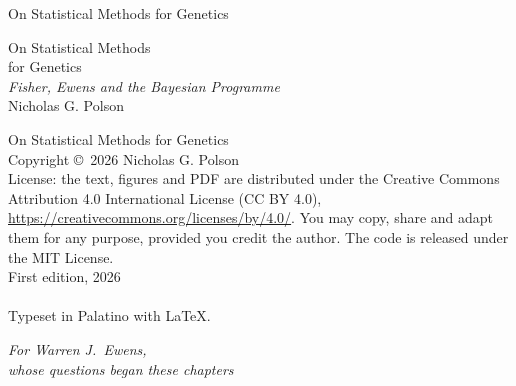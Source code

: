 \documentclass[11pt,openright,twoside]{book}
\theoremstyle{bookplain}
\theoremstyle{bookdef}
\numberwithin{equation}{chapter}
\numberwithin{figure}{chapter}
\numberwithin{table}{chapter}
\begin{document}
\frontmatter
\pagestyle{empty}

\begin{center}
\vspace*{2.2in}
{\LARGE On Statistical Methods for Genetics}
\end{center}
\cleardoublepage

\begin{center}
\vspace*{1.3in}
{\Huge On Statistical Methods\\[8pt] for Genetics}\\[22pt]
{\large\itshape Fisher, Ewens and the Bayesian Programme}\\[1.6in]
{\Large Nicholas G. Polson}
\vfill
\end{center}
\clearpage

\begin{flushleft}
\vspace*{\fill}
\small
On Statistical Methods for Genetics\\
Copyright \copyright\ 2026 Nicholas G. Polson\\[6pt]
License: the text, figures and PDF are distributed under the Creative Commons Attribution 4.0 International License (CC BY 4.0), \url{https://creativecommons.org/licenses/by/4.0/}. You may copy, share and adapt them for any purpose, provided you credit the author. The code is released under the MIT License.\\[6pt]
First edition, 2026\\[6pt]
\ifx\BookDOIline\empty\else\BookDOIline\\[6pt]\fi
Typeset in Palatino with \LaTeX.
\end{flushleft}
\cleardoublepage

\begin{center}
\vspace*{2.4in}
\itshape For Warren J.\ Ewens,\\[4pt]
whose questions began these chapters
\end{center}
\cleardoublepage

\pagestyle{fancy}
\tableofcontents
\cleardoublepage
\fancyhead[LE]{\small\thepage\hspace{1.2em}\scshape\MakeLowercase{\leftmark}}
\fancyhead[RO]{\small\scshape\MakeLowercase{\rightmark}\hspace{1.2em}\upshape\thepage}
\end{document}
